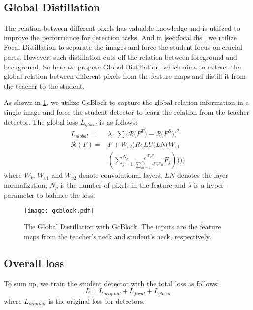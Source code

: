 \documentclass[10pt,twocolumn,letterpaper]{article}
\begin{document}
\subsection{Global Distillation}
The relation\cite{wang2018non, hu2018relation, cao2019gcnet} between different pixels has valuable knowledge and is utilized to improve the performance for detection tasks. And in \cref{sec:focal dis}, we utilize Focal Distillation to separate the images and force the student focus on crucial parts. However, such distillation cuts off the relation between foreground and background. So here we propose Global Distillation, which aims to extract the global relation between different pixels from the feature maps and distill it from the teacher to the student.

As shown in \cref{figure:gcblock}, we utilize GcBlock\cite{cao2019gcnet} to capture the global relation information in a single image and force the student detector to learn the relation from the teacher detector. The global loss $L_{global}$ is as follows:
\begin{equation}
\begin{split}
    \label{l-global}
        L_{global}=&\lambda\cdot\sum\Big(\mathcal{R}\big( F^{T}\big) - \mathcal{R}\big(F^{S}\big)\Big)^{2} \\
        \mathcal{R}(F)=&F + W_{v2}(ReLU(LN(W_{v1} \\
        &(\sum_{j=1}^{N_{p}}\frac{e^{W_{k}F_{j}}}{\sum_{m=1}^{N_{p}}e^{W_{k}F_{M}}}F_{j}))))
\end{split}
\end{equation}
where $W_{k}$, $W_{v1}$ and $W_{v2}$ denote convolutional layers, $LN$ denotes the layer normalization, $N_{p}$ is the number of pixels in the feature and $\lambda$ is a hyper-parameter to balance the loss.
\begin{figure}
  \centering
  \texttt{[image: gcblock.pdf]}
  \caption{The Global Distillation with GcBlock. The inputs are the feature maps from the teacher's neck and student's neck, respectively.}
  \label{figure:gcblock}
\end{figure}

\subsection{Overall loss}
To sum up, we train the student detector with the total loss as follows:
\begin{equation}
    \label{l-all}
        L=L_{original}+L_{focal}+L_{global}
\end{equation}
where $L_{original}$ is the original loss for detectors.
\end{document}

